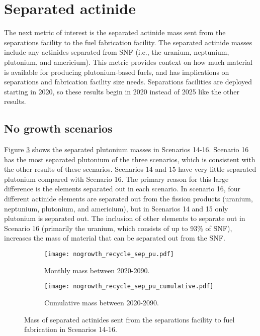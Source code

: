 \section{Separated actinide}
The next metric of interest is the separated actinide mass sent 
from the separations facility to the fuel fabrication facility. 
The separated actinide masses include any actinides separated 
from \gls{SNF} (i.e., the uranium, neptunium, plutonium, and 
americium). 
This metric provides context on how much material is available for 
producing plutonium-based fuels, and has implications on 
separations and fabrication facility size needs. Separations facilities 
are deployed starting in 2020, so these results begin in 2020 instead 
of 2025 like the other results. 

\subsection{No growth scenarios}
Figure \ref{fig:nogrowth_recycle_sep_pu} shows the separated plutonium 
masses in Scenarios 14-16. Scenario 16 has the most separated 
plutonium of the three scenarios, which is consistent with the other 
results of these scenarios. Scenarios 14 and 15 have very little 
separated plutonium compared with Scenario 16. The primary reason 
for this large difference is the elements separated out in 
each scenario. In scenario 16, four different actinide elements 
are separated out from the fission products (uranium, neptunium,
plutonium, and americium), but in Scenarios 14 and 15 only plutonium 
is separated out. The inclusion of other elements to separate out 
in Scenario 16 (primarily the uranium, which consists of up to 
93\% of \gls{SNF}), increases the mass of material that can be 
separated out from the \gls{SNF}. 

\begin{figure}[h!]
    \centering
    \begin{subfigure}[b]{0.49\textwidth}
        \centering
        \texttt{[image: nogrowth\_recycle\_sep\_pu.pdf]}
        \caption{Monthly mass between 2020-2090.}
        \label{fig:nogrowth_recycle_sep_pu_all}
    \end{subfigure}
    \hfill
    \begin{subfigure}[b]{0.49\textwidth}
        \centering
        \texttt{[image: nogrowth\_recycle\_sep\_pu\_cumulative.pdf]}
        \caption{Cumulative mass between 2020-2090.}
        \label{fig:nogrowth_recycle_sep_pu_cumulative}
    \end{subfigure}
       \caption{Mass of separated actinides sent from the 
       separations facility to fuel fabrication in Scenarios 14-16.}
       \label{fig:nogrowth_recycle_sep_pu}
\end{figure}

